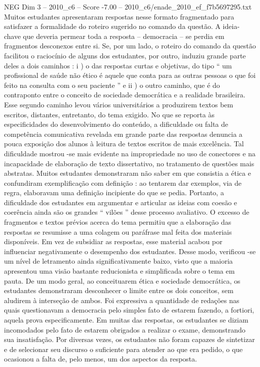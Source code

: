 \begin{textsample}{NEG Dim 3 – 2010\_c6 – Score -7.00 – 2010\_c6/enade\_2010\_ef\_f7b5697295.txt}
Muitos estudantes apresentaram respostas nesse formato fragmentado para satisfazer a formalidade do roteiro sugerido no comando da questão.
A ideia-chave que deveria permear toda a resposta – democracia – se perdia em fragmentos desconexos entre si.
Se, por um lado, o roteiro do comando da questão facilitou o raciocínio de alguns dos estudantes, por outro, induziu grande parte deles a dois caminhos : i ) o das respostas curtas e objetivas, do tipo “ um profissional de saúde não ético é aquele que conta para as outras pessoas o que foi feito na consulta com o seu paciente ” e ii ) o outro caminho, que é do contraponto entre o conceito de sociedade democrática e a realidade brasileira.
Esse segundo caminho levou vários universitários a produzirem textos bem escritos, distantes, entretanto, do tema exigido.
No que se reporta às especificidades do desenvolvimento do conteúdo, a dificuldade ou falta de competência comunicativa revelada em grande parte das respostas denuncia a pouca exposição dos alunos à leitura de textos escritos de mais excelência.
Tal dificuldade mostrou -se mais evidente na impropriedade no uso de conectores e na incapacidade de elaboração de texto dissertativo, no tratamento de questões mais abstratas.
Muitos estudantes demonstraram não saber em que consistia a ética e confundiram exemplificação com definição : ao tentarem dar exemplos, via de regra, elaboravam uma definição incipiente do que se pedia.
Portanto, a dificuldade dos estudantes em argumentar e articular as ideias com coesão e coerência ainda são os grandes “ vilões ” desse processo avaliativo.
O excesso de fragmentos e textos prévios acerca do tema permitiu que a elaboração das respostas se resumisse a uma colagem ou paráfrase mal feita dos materiais disponíveis.
Em vez de subsidiar as respostas, esse material acabou por influenciar negativamente o desempenho dos estudantes.
Desse modo, verificou -se um nível de letramento ainda significativamente baixo, visto que a maioria apresentou uma visão bastante reducionista e simplificada sobre o tema em pauta.
De um modo geral, ao conceituarem ética e sociedade democrática, os estudantes demonstraram desconhecer o limite entre os dois conceitos, sem aludirem à interseção de ambos.
Foi expressiva a quantidade de redações nas quais questionavam a democracia pelo simples fato de estarem fazendo, a fortiori, aquela prova especificamente.
Em muitas das respostas, os estudantes se diziam incomodados pelo fato de estarem obrigados a realizar o exame, demonstrando sua insatisfação.
Por diversas vezes, os estudantes não foram capazes de sintetizar e de selecionar seu discurso o suficiente para atender ao que era pedido, o que ocasionou a falta de, pelo menos, um dos aspectos da resposta.

\end{textsample}
